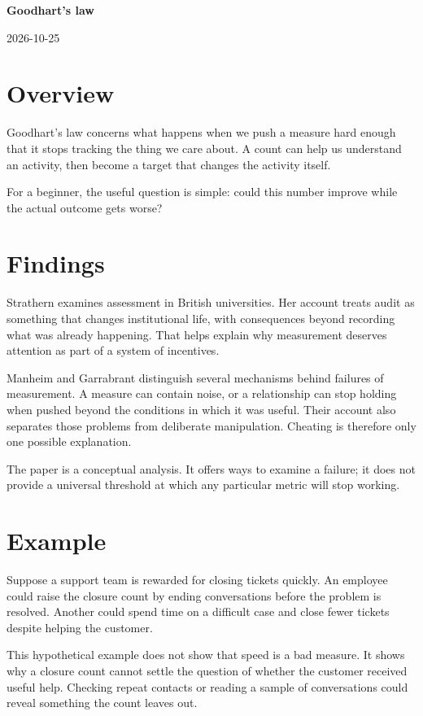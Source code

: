 \documentclass[11pt,a4paper]{article}
\newcommand{\researchtitle}{Goodhart's law}
\newcommand{\researchdate}{2026-10-25}
\begin{document}
{\LARGE\bfseries\researchtitle\par}
\vspace{0.4em}
{\small\researchdate\par}

\section{Overview}

Goodhart's law concerns what happens when we push a measure hard enough
that it stops tracking the thing we care about. A count can help us
understand an activity, then become a target that changes the activity
itself. \cite{manheim}

For a beginner, the useful question is simple: could this number improve
while the actual outcome gets worse?

\section{Findings}

Strathern examines assessment in British universities. Her account treats
audit as something that changes institutional life, with consequences
beyond recording what was already happening. That helps explain why
measurement deserves attention as part of a system of incentives.
\cite{strathern}

Manheim and Garrabrant distinguish several mechanisms behind failures of
measurement. A measure can contain noise, or a relationship can stop
holding when pushed beyond the conditions in which it was useful.
Their account also separates those problems from deliberate manipulation.
Cheating is therefore only one possible explanation. \cite{manheim}

The paper is a conceptual analysis. It offers ways to examine a failure;
it does not provide a universal threshold at which any particular metric
will stop working.

\section{Example}

Suppose a support team is rewarded for closing tickets quickly. An
employee could raise the closure count by ending conversations before
the problem is resolved. Another could spend time on a difficult case
and close fewer tickets despite helping the customer.

This hypothetical example does not show that speed is a bad measure.
It shows why a closure count cannot settle the question of whether the
customer received useful help. Checking repeat contacts or reading a
sample of conversations could reveal something the count leaves out.
\end{document}
